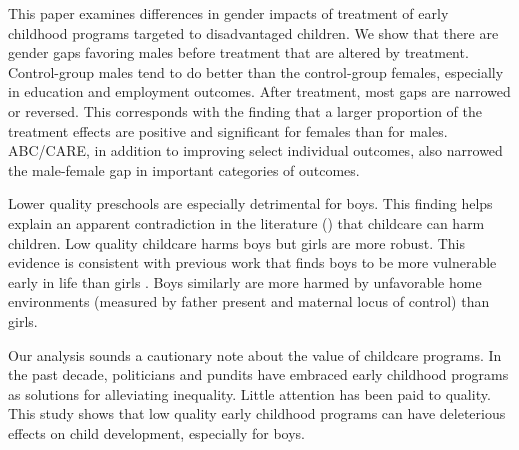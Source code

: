 This paper examines differences in gender impacts of treatment of early childhood programs targeted to disadvantaged children. We show that there are gender gaps favoring males before treatment that are altered by treatment. Control-group males tend to do better than the control-group females, especially in education and employment outcomes. After treatment, most gaps are narrowed or reversed. This corresponds with the finding that a larger proportion of the treatment effects are positive and significant for females than for males. ABC/CARE, in addition to improving select individual outcomes, also narrowed the male-female gap in important categories of outcomes.

Lower quality preschools are especially detrimental for boys. This finding helps explain an apparent contradiction in the literature (\citet{Baker_Gruber_etal_2008_JPE,Baker_Gruber_Milligan_2015_Noncog_Defects,Kottelenberg-Lehrer_2014_Gender-Effects}) that childcare can harm children. Low quality childcare harms boys but girls are more robust. This evidence is consistent with previous work that finds boys to be more vulnerable early in life than girls \citep{golding2016psychology}. Boys similarly are more harmed by unfavorable home environments (measured by father present and maternal locus of control) than girls.

Our analysis sounds a cautionary note about the value of childcare programs. In the past decade, politicians and pundits have embraced early childhood programs as solutions for alleviating inequality. Little attention has been paid to quality. This study shows that low quality early childhood programs can have deleterious effects on child development, especially for boys.

